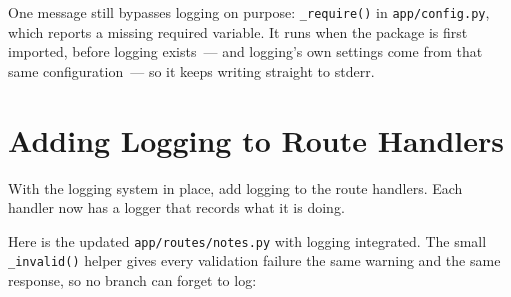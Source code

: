 \begin{codebox}[short]

\begin{Shaded}
\begin{Highlighting}[]
  \OperatorTok{==} \NormalTok{:}
\StringTok{:}
\OperatorTok{=}\OperatorTok{=}\OperatorTok{=}
\end{Highlighting}
\end{Shaded}

\end{codebox}

\noindent{}One message still bypasses logging on purpose: \texttt{\_require()} in \texttt{app/config.py}, which reports a missing required variable. It runs when the package is first imported, before logging exists~--- and logging's own settings come from that same configuration~--- so it keeps writing straight to stderr.

\setcounter{section}{6}
\section{Adding Logging to Route Handlers}\label{16-logging-error-handling:167-adding-logging-to-route-handlers}

With the logging system in place, add logging to the route handlers. Each handler now has a logger that records what it is doing.

Here is the updated \texttt{app/}\allowbreak{}\texttt{routes/}\allowbreak{}\texttt{notes.py} with logging integrated. The small \texttt{\_invalid()} helper gives every validation failure the same warning and the same response, so no branch can forget to log:

